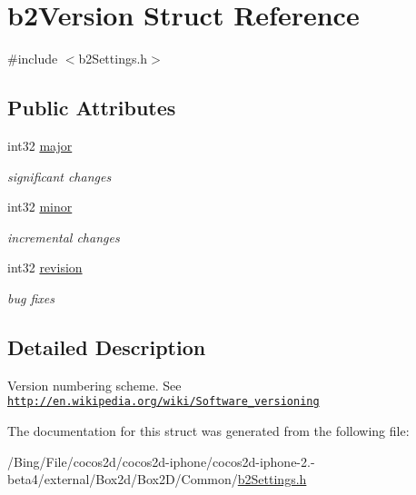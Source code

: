 \hypertarget{structb2_version}{\section{b2\-Version Struct Reference}
\label{structb2_version}
}


{\ttfamily \#include $<$b2\-Settings.\-h$>$}

\subsection*{Public Attributes}
\begin{DoxyCompactItemize}
\item 
\hypertarget{structb2_version_a720da8e346364d1cb34d176125380b44}{int32 \hyperlink{structb2_version_a720da8e346364d1cb34d176125380b44}{major}}\label{structb2_version_a720da8e346364d1cb34d176125380b44}

\begin{DoxyCompactList}\small\item\em significant changes \end{DoxyCompactList}\item 
\hypertarget{structb2_version_a115b8797a6e0b8e53f54502bd20d89da}{int32 \hyperlink{structb2_version_a115b8797a6e0b8e53f54502bd20d89da}{minor}}\label{structb2_version_a115b8797a6e0b8e53f54502bd20d89da}

\begin{DoxyCompactList}\small\item\em incremental changes \end{DoxyCompactList}\item 
\hypertarget{structb2_version_a395cfe1434e348115d2ead3d72b88847}{int32 \hyperlink{structb2_version_a395cfe1434e348115d2ead3d72b88847}{revision}}\label{structb2_version_a395cfe1434e348115d2ead3d72b88847}

\begin{DoxyCompactList}\small\item\em bug fixes \end{DoxyCompactList}\end{DoxyCompactItemize}


\subsection{Detailed Description}
Version numbering scheme. See \href{http://en.wikipedia.org/wiki/Software_versioning}{\tt http\-://en.\-wikipedia.\-org/wiki/\-Software\-\_\-versioning} 

The documentation for this struct was generated from the following file\-:\begin{DoxyCompactItemize}
\item 
/\-Bing/\-File/cocos2d/cocos2d-\/iphone/cocos2d-\/iphone-\/2.-\/beta4/external/\-Box2d/\-Box2\-D/\-Common/\hyperlink{b2_settings_8h}{b2\-Settings.\-h}\end{DoxyCompactItemize}
